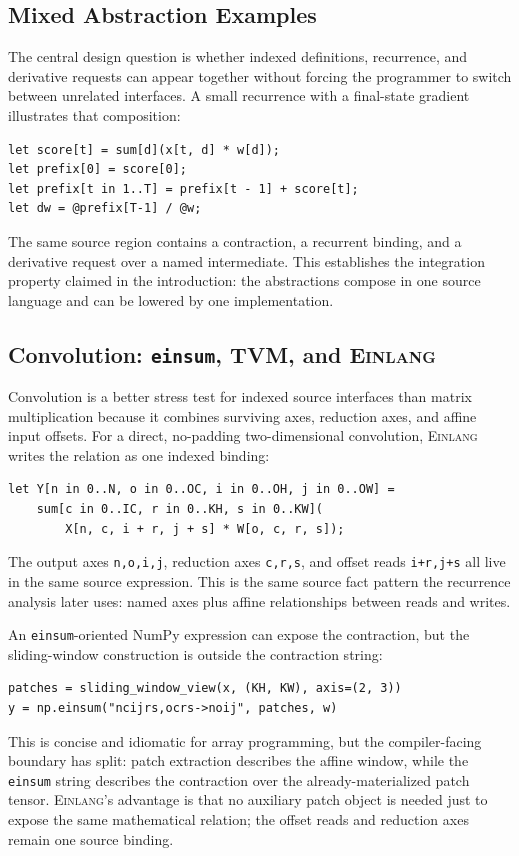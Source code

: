 \documentclass[sigplan,screen,nonacm]{acmart}
\newcommand{\einlang}{\textsc{Einlang}}
\begin{document}
\subsection{Mixed Abstraction Examples}

The central design question is whether indexed definitions, recurrence, and derivative requests can appear together without forcing the programmer to switch between unrelated interfaces. A small recurrence with a final-state gradient illustrates that composition:
\begin{lstlisting}[style=einlang]
let score[t] = sum[d](x[t, d] * w[d]);
let prefix[0] = score[0];
let prefix[t in 1..T] = prefix[t - 1] + score[t];
let dw = @prefix[T-1] / @w;
\end{lstlisting}
The same source region contains a contraction, a recurrent binding, and a derivative request over a named intermediate. This establishes the integration property claimed in the introduction: the abstractions compose in one source language and can be lowered by one implementation.

\subsection{Convolution: \texttt{einsum}, TVM, and \einlang{}}
\label{sec:conv-comparison}

Convolution is a better stress test for indexed source interfaces than matrix multiplication because it combines surviving axes, reduction axes, and affine input offsets. For a direct, no-padding two-dimensional convolution, \einlang{} writes the relation as one indexed binding:
\begin{lstlisting}[style=einlang]
let Y[n in 0..N, o in 0..OC, i in 0..OH, j in 0..OW] =
    sum[c in 0..IC, r in 0..KH, s in 0..KW](
        X[n, c, i + r, j + s] * W[o, c, r, s]);
\end{lstlisting}
The output axes \texttt{n,o,i,j}, reduction axes \texttt{c,r,s}, and offset reads \texttt{i+r,j+s} all live in the same source expression. This is the same source fact pattern the recurrence analysis later uses: named axes plus affine relationships between reads and writes.

An \texttt{einsum}-oriented NumPy expression can expose the contraction, but the sliding-window construction is outside the contraction string:
\begin{lstlisting}[style=pythoncode]
patches = sliding_window_view(x, (KH, KW), axis=(2, 3))
y = np.einsum("ncijrs,ocrs->noij", patches, w)
\end{lstlisting}
This is concise and idiomatic for array programming, but the compiler-facing boundary has split: patch extraction describes the affine window, while the \texttt{einsum} string describes the contraction over the already-materialized patch tensor. \einlang{}'s advantage is that no auxiliary patch object is needed just to expose the same mathematical relation; the offset reads and reduction axes remain one source binding.
\end{document}

